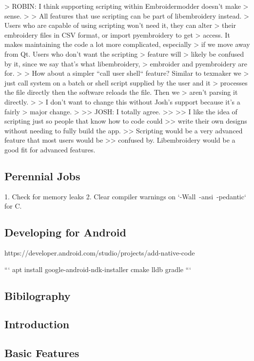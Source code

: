 \documentclass[a4paper]{report}
\begin{document}
{{{{{{> ROBIN: I think supporting scripting within Embroidermodder doesn't make
> sense.
>
> All features that use scripting can be part of libembroidery instead.
> Users who are capable of using scripting won't need it, they can alter
> their embroidery files in CSV format, or import pyembroidery to get
> access. It makes maintaining the code a lot more complicated, especially
> if we move away from Qt. Users who don't want the scripting > feature will
> likely be confused by it, since we say that's what  libembroidery,
> embroider and pyembroidery are for.
>
> How about a simpler ``call user shell`` feature? Similar to texmaker we
> just call system on a batch or shell script supplied by the user and it
> processes the file directly then the software reloads the file. Then we
> aren't parsing it directly.
>
> I don't want to change this without Josh's support because it's a fairly
> major change.
>
>> JOSH: I totally agree.
>>
>> I like the idea of scripting just so people that know how to code could
>> write their own designs without needing to fully build the app.
>> Scripting would be a very advanced feature that most users would be
>> confused by. Libembroidery would be a good fit for advanced features.

\subsection{Perennial Jobs}

1. Check for memory leaks
2. Clear compiler warnings on `-Wall\ -ansi\ -pedantic` for C.

\subsection{Developing for Android}

https://developer.android.com/studio/projects/add-native-code

```
apt install google-android-ndk-installer cmake lldb gradle
```

\subsection{Bibilography}

\subsection{Introduction}

\subsection{Basic Features}

}}}}}}
\end{document}

